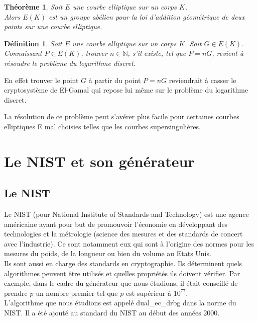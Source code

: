 \documentclass[a4paper,11pt]{report}
\newtheorem{theo}{Th\'eor\`eme}[section]
\newtheorem{defi}{D\'efinition}[section]
\begin{document}
		
		\begin{theo}
		Soit $E$ une courbe elliptique sur un corps $K$.\\
		Alors $E(K)$ est un groupe ab\'elien pour la loi d'addition g\'eom\'etrique de deux points sur une %
		courbe elliptique.
		\end{theo}
	
	\begin{defi}
	Soit $E$ une courbe elliptique sur un corps $K$. Soit $G\in E(K)$.\\
	Connaissant $P\in E(K)$, trouver $n\in \mathbb{N}$, s'il existe, tel que $P=nG$, revient %
	\`a r\'esoudre le probl\`eme du logarithme discret.
	\end{defi}
	
	
	En effet trouver le point $G$ \`a partir du point $P=nG$ reviendrait \`a casser le cryptosyst\`eme  %
	de El-Gamal qui repose lui m\^eme sur le probl\`eme du logarithme discret.
	
	
	La r\'esolution de ce probl\`eme peut s'av\'erer plus facile pour certaines courbes elliptiques E mal choisies telles que %
	les courbes supersinguli\`eres. 
	
	
	\section{Le NIST et son g\'en\'erateur}
	\subsection{Le NIST}
	Le NIST (pour National Institute of Standards and Technology) est une agence am\'ericaine ayant %
	pour but de promouvoir l'\'economie en d\'eveloppant des technologies et la m\'etrologie (science des %
	mesures et des standards de concert avec l'industrie). Ce sont notamment eux qui sont %
	 \`a l'origine des normes pour les mesures du poids, de la longueur ou bien du volume au Etats %
	 Unis. \\
	 Ils sont aussi en charge des standards en cryptographie. Ils d\'eterminent quels algorithmes %
	 peuvent \^etre utilis\'es et quelles propri\'et\'es ils doivent v\'erifier. Par exemple, dans le cadre %
	 du g\'en\'erateur que nous \'etudions, il \'etait conseill\'e de prendre $p$ un nombre premier tel %
	 que $p$ est sup\'erieur \`a $10^{77}$. \\
	 L'algorithme que nous \'etudions est appel\'e dual\_ec\_drbg dans la norme du NIST. Il a \'et\'e %
	  ajout\'e au standard du NIST au d\'ebut des ann\'ees 2000.\\
	  
\end{document}
